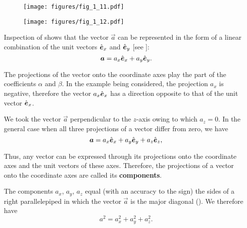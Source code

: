 \begin{figure}[t]
	\begin{minipage}[t]{0.5\linewidth}
		\begin{center}
			\texttt{[image: figures/fig\_1\_11.pdf]}
			\caption[]{}
			\label{fig:1_11}
		\end{center}
	\end{minipage}
	\hfill{ }%
	\begin{minipage}[t]{0.5\linewidth}
		\begin{center}
			\texttt{[image: figures/fig\_1\_12.pdf]}
			\caption[]{}
			\label{fig:1_12}
		\end{center}
	\end{minipage}
	\vspace{-0.8cm}
\end{figure}

Inspection of  shows that the vector $\vec{a}$ can be represented in the form of a linear combination of the unit vectors $\hat{\boldsymbol{e}}_{x}$ and $\hat{\boldsymbol{e}}_{y}$ [see ]:
\begin{equation*}
\boldsymbol{a} = a_x \hat{\boldsymbol{e}}_{x} + a_y \hat{\boldsymbol{e}}_{y}.
\end{equation*}

\noindent
The projections of the vector onto the coordinate axes play the part of the coefficients $\alpha$ and $\beta$. In the example being considered, the projection $a_x$ is negative, therefore the vector $a_x\hat{\boldsymbol{e}}_{x}$ has a direction opposite to that of the unit vector $\hat{\boldsymbol{e}}_{x}$.

We took the vector $\vec{a}$ perpendicular to the $z$-axis owing to which $a_z=0$. In the general case when all three projections of a vector differ from zero, we have
\begin{equation}\label{eq:1_9}
\boldsymbol{a} = a_x \hat{\boldsymbol{e}}_{x} + a_y \hat{\boldsymbol{e}}_{y} + a_z \hat{\boldsymbol{e}}_{z},
\end{equation}

\noindent
Thus, any vector can be expressed through its projections onto the coordinate axes and the unit vectors of these axes. Therefore, the projections of a vector onto the coordinate axes are called its \textbf{components}.

The components $a_x$, $a_y$, $a_z$ equal (with an accuracy to the sign) the sides of a right parallelepiped in which the vector $\vec{a}$ is the major diagonal (). We therefore have
\begin{equation}\label{eq:1_10}
a^2 = a_x^2 + a_y^2 + a_z^2.
\end{equation}

